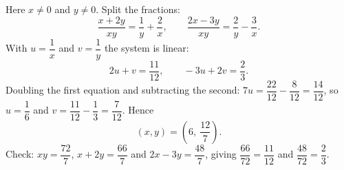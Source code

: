 Here $x\ne0$ and $y\ne0$. Split the fractions:
\[\dfrac{x+2y}{xy}=\dfrac{1}{y}+\dfrac{2}{x},\qquad\dfrac{2x-3y}{xy}=\dfrac{2}{y}-\dfrac{3}{x}.\]
With $u=\dfrac{1}{x}$ and $v=\dfrac{1}{y}$ the system is linear:
\[2u+v=\dfrac{11}{12},\qquad-3u+2v=\dfrac{2}{3}.\]
Doubling the first equation and subtracting the second: $7u=\dfrac{22}{12}-\dfrac{8}{12}=\dfrac{14}{12}$, so $u=\dfrac{1}{6}$ and $v=\dfrac{11}{12}-\dfrac{1}{3}=\dfrac{7}{12}$. Hence
\[(x,y)=\boxed{\left(6,\ \dfrac{12}{7}\right)}.\]
Check: $xy=\dfrac{72}{7}$, $x+2y=\dfrac{66}{7}$ and $2x-3y=\dfrac{48}{7}$, giving $\dfrac{66}{72}=\dfrac{11}{12}$ and $\dfrac{48}{72}=\dfrac{2}{3}$.
